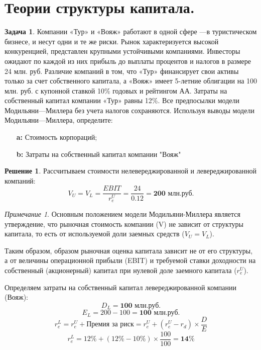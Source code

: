\documentclass[a4paper, 14pt]{article}
\theoremstyle{plain} %
\theoremstyle{definition} %
\newtheorem*{solution}{Решение}
\newtheorem{problem}{Задача}[subsection]
\theoremstyle{remark} %
\newtheorem{nota}{Примечание}
\begin{document}
\section{Теории структуры капитала.}

\begin{problem}
	Компании «Тур» и «Вояж» работают в одной сфере —в туристическом бизнесе, и несут одни и те же риски. Рынок характеризуется высокой конкуренцией, представлен крупными устойчивыми компаниями. Инвесторы ожидают по каждой из них прибыль до выплаты процентов и налогов в размере 24 млн. руб. Различие компаний в том, что «Тур» финансирует свои активы только за счет собственного капитала, а «Вояж» имеет 5-летние облигации на 100 млн. руб. с купонной ставкой 10\% годовых и рейтингом АА. Затраты на собственный капитал компании «Тур» равны 12\%. Все предпосылки модели Модильяни—Миллера без учета налогов сохраняются. Используя выводы модели Модильяни—Миллера, определите:
	\begin{itemize}
		\item[\textbf{a:}] Стоимость корпораций;
		\item[\textbf{b:}] Затраты на собственный капитал компании "Вояж"
	\end{itemize}
	\begin{solution}
		Рассчитываем стоимости нелевереджированной и левереджированной компаний:
		\[V_{U}=V_{L}=\frac{EBIT}{r_{e}^{U}}=\frac{24}{0.12} = \textbf{200 млн.руб.}\]
		\begin{nota}
			Основным положением модели Модильяни-Миллера является утверждение, что рыночная стоимость компании (V) не зависит от структуры капитала, то есть от используемой доли заемных средств ($V_{U}=V_{L}$).

			Таким образом, образом рыночная оценка капитала зависит не от его структуры, а от величины операционной прибыли (EBIT) и требуемой ставки доходности на собственный (акционерный) капитал при нулевой доле заемного капитала ($r_{e}^{U}$).
		\end{nota}
		Определяем затраты на собственный капитал левереджированной компании (Вояж):
		\[D_{L} = \textbf{100 млн.руб.}\]
		\[E_{L} = 200 - 100 = \textbf{100 млн.руб.}\]
		\[r_{e}^{L} = r_{e}^{U} + \textit{Премия за риск} = r_{e}^{U} + (r_{e}^{U}-r_{d})\times \frac{D}{E}\]
		\[r_{e}^{L} = 12\% + (12\%-10\%)\times \frac{100}{100} = \textbf{14\%}\]
	\end{solution}
\end{problem}
\end{document}
